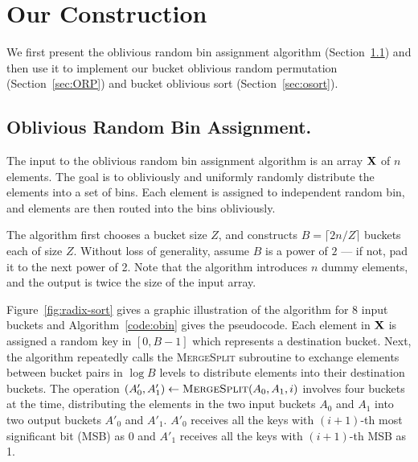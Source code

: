 



\section{Our Construction} 
\label{sec:construction}
\label{sec:random-bin-assignment}

We first present the oblivious random bin assignment algorithm (Section~\ref{sec:obin})  and then use it to implement our bucket oblivious random permutation (Section~\ref{sec:ORP}) and bucket oblivious sort (Section~\ref{sec:osort}).

\newcommand{\val}{{\sf value}}
\newcommand{\pref}{{\sf pref}}


\subsection{Oblivious Random Bin Assignment.}
\label{sec:obin}

The input to the oblivious random bin assignment algorithm is an array $\mathbf{X}$ of $n$ elements. 
The goal is to obliviously and uniformly randomly distribute the elements into a set of bins. Each element is assigned to independent random bin, and elements are then routed into the bins obliviously. 

The algorithm first chooses a bucket size $Z$, 
and constructs $B=\lceil 2n/Z \rceil$ buckets each of size $Z$.
Without loss of generality, assume $B$ is a power of $2$ --- if not, pad it to the next power of 2. Note that the algorithm introduces $n$ dummy elements, and the output is twice the size of the input array. %


Figure~\ref{fig:radix-sort} gives a graphic illustration of the algorithm for 8 input buckets and Algorithm~\ref{code:obin} gives the pseudocode.
Each element in $\mathbf{X}$ is assigned a random key in $[0, B-1]$ which represents a destination bucket.
Next, the algorithm repeatedly calls the \textsc{MergeSplit} subroutine to exchange elements between bucket pairs in $\log B$ levels to distribute elements into their destination buckets. 
The operation $(A'_0,A'_1)\leftarrow \textsc{MergeSplit}(A_0,A_1,i)$ involves four buckets at the time, distributing the elements in the two input buckets $A_0$ and $A_1$ into two output buckets $A'_0$ and $A'_1$.
$A'_0$ receives all the keys with $(i+1)$-th most significant bit (MSB) as 0 and $A'_1$ receives all the keys with $(i+1)$-th MSB as 1.


